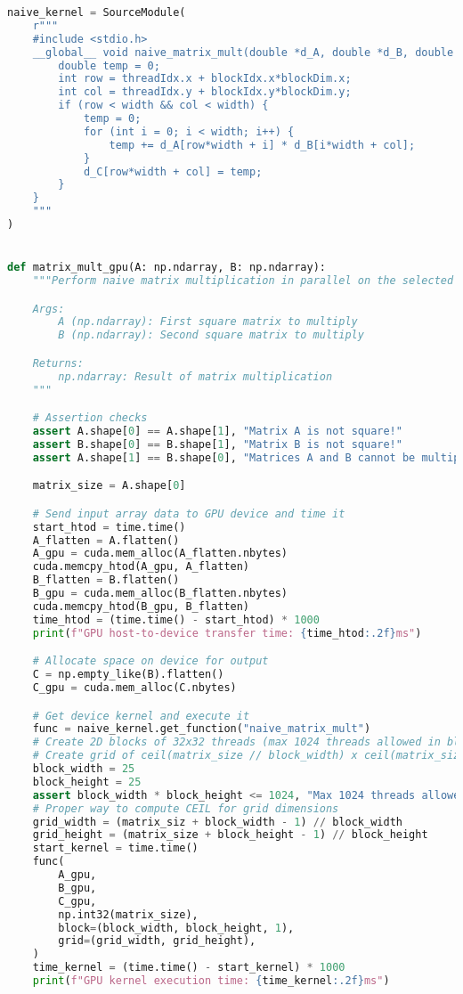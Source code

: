 \documentclass[11pt,twoside]{article}
\begin{document}
\begin{enumerate}
\begin{lstlisting}[language=Python]
naive_kernel = SourceModule(
    r"""
    #include <stdio.h>
    __global__ void naive_matrix_mult(double *d_A, double *d_B, double *d_C, int width) {
        double temp = 0;
        int row = threadIdx.x + blockIdx.x*blockDim.x;
        int col = threadIdx.y + blockIdx.y*blockDim.y;
        if (row < width && col < width) {
            temp = 0;
            for (int i = 0; i < width; i++) {
                temp += d_A[row*width + i] * d_B[i*width + col];
            }
            d_C[row*width + col] = temp;
        }
    }
    """
)


def matrix_mult_gpu(A: np.ndarray, B: np.ndarray):
    """Perform naive matrix multiplication in parallel on the selected GPU device

    Args:
        A (np.ndarray): First square matrix to multiply
        B (np.ndarray): Second square matrix to multiply

    Returns:
        np.ndarray: Result of matrix multiplication
    """

    # Assertion checks
    assert A.shape[0] == A.shape[1], "Matrix A is not square!"
    assert B.shape[0] == B.shape[1], "Matrix B is not square!"
    assert A.shape[1] == B.shape[0], "Matrices A and B cannot be multiplied!"

    matrix_size = A.shape[0]

    # Send input array data to GPU device and time it
    start_htod = time.time()
    A_flatten = A.flatten()
    A_gpu = cuda.mem_alloc(A_flatten.nbytes)
    cuda.memcpy_htod(A_gpu, A_flatten)
    B_flatten = B.flatten()
    B_gpu = cuda.mem_alloc(B_flatten.nbytes)
    cuda.memcpy_htod(B_gpu, B_flatten)
    time_htod = (time.time() - start_htod) * 1000
    print(f"GPU host-to-device transfer time: {time_htod:.2f}ms")

    # Allocate space on device for output
    C = np.empty_like(B).flatten()
    C_gpu = cuda.mem_alloc(C.nbytes)

    # Get device kernel and execute it
    func = naive_kernel.get_function("naive_matrix_mult")
    # Create 2D blocks of 32x32 threads (max 1024 threads allowed in block)
    # Create grid of ceil(matrix_size // block_width) x ceil(matrix_size // block_height) blocks
    block_width = 25
    block_height = 25
    assert block_width * block_height <= 1024, "Max 1024 threads allowed in block!"
    # Proper way to compute CEIL for grid dimensions
    grid_width = (matrix_siz + block_width - 1) // block_width
    grid_height = (matrix_size + block_height - 1) // block_height
    start_kernel = time.time()
    func(
        A_gpu,
        B_gpu,
        C_gpu,
        np.int32(matrix_size),
        block=(block_width, block_height, 1),
        grid=(grid_width, grid_height),
    )
    time_kernel = (time.time() - start_kernel) * 1000
    print(f"GPU kernel execution time: {time_kernel:.2f}ms")


\end{lstlisting}
\end{enumerate}
\end{document}
